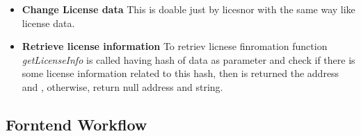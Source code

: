 \begin{itemize}
\begin{itemize}
	\end{itemize}
	\item \textbf{Change License data}
	This is doable just by licesnor  with the same way like license data.  \\
	\item \textbf{Retrieve license information}
	To retriev licnese finromation function \textit{getLicenseInfo} is called having hash of data as parameter and check if there is some license information related to this hash, then is returned the address and , otherwise, return null address and string.
	
\end{itemize}
\subsection{Forntend Workflow}
